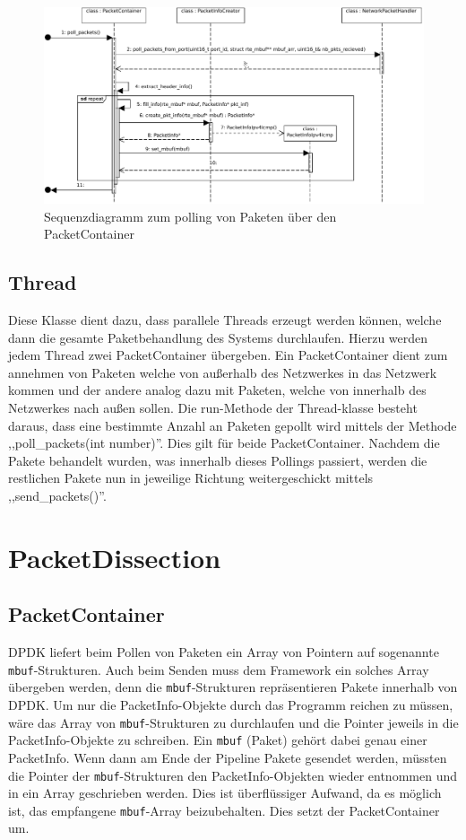 \documentclass[../review_2.tex]{subfiles}
\begin{document}
\begin{figure}
	\centering
	\includegraphics[width=\linewidth]{img/SequenceDiagramPacketDissection2.pdf}
	\caption{Sequenzdiagramm zum polling von Paketen über den PacketContainer}
	\label{Sequenzdiagramm_PacketDissection}
\end{figure}

\subsection{Thread}
Diese Klasse dient dazu, dass parallele Threads erzeugt werden können, welche dann die gesamte Paketbehandlung des Systems durchlaufen. Hierzu werden jedem Thread zwei PacketContainer übergeben. Ein PacketContainer dient zum annehmen von Paketen welche von außerhalb des Netzwerkes in das Netzwerk kommen und der andere analog dazu mit Paketen, welche von innerhalb des Netzwerkes nach außen sollen. Die run-Methode der Thread-klasse besteht daraus, dass eine bestimmte Anzahl an Paketen gepollt wird mittels der Methode ,,poll\_packets(int number)''. Dies gilt für beide PacketContainer. Nachdem die Pakete behandelt wurden, was innerhalb dieses Pollings passiert, werden die restlichen Pakete nun in jeweilige Richtung weitergeschickt mittels ,,send\_packets()''.

\section{PacketDissection}
\subsection{PacketContainer}
DPDK liefert beim Pollen von Paketen ein Array von Pointern auf sogenannte \texttt{mbuf}-Strukturen. Auch beim Senden muss dem Framework ein solches Array übergeben werden, denn die \texttt{mbuf}-Strukturen repräsentieren Pakete innerhalb von DPDK. Um nur die PacketInfo-Objekte durch das Programm reichen zu müssen, wäre das Array von \texttt{mbuf}-Strukturen zu durchlaufen und die Pointer jeweils in die PacketInfo-Objekte zu schreiben. Ein \texttt{mbuf} (Paket) gehört dabei genau einer PacketInfo. Wenn dann am Ende der Pipeline Pakete gesendet werden, müssten die Pointer der \texttt{mbuf}-Strukturen den PacketInfo-Objekten wieder entnommen und in ein Array geschrieben werden. Dies ist überflüssiger Aufwand, da es möglich ist, das empfangene \texttt{mbuf}-Array beizubehalten. Dies setzt der PacketContainer um.
\end{document}
